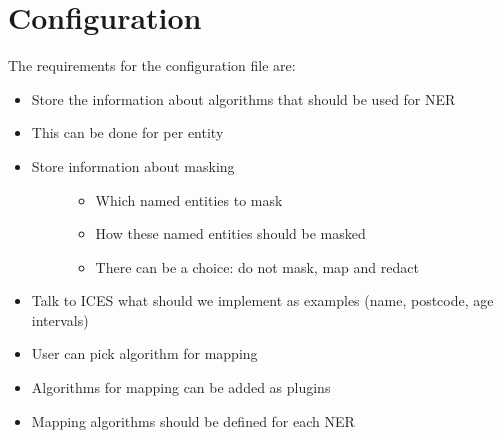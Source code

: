 \documentclass[letterpaper,10pt,english]{sphinxmanual}
\begin{document}
\section{Configuration}
\label{\detokenize{index:configuration}}
The requirements for the configuration file are:
\begin{itemize}
\item {} 
Store the information about algorithms that should be used for NER

\item {} 
This can be done for per entity

\item {} \begin{description}
\item[{Store information about masking}] \leavevmode\begin{itemize}
\item {} 
Which named entities to mask

\item {} 
How these named entities should be masked

\item {} 
There can be a choice: do not mask, map and redact

\end{itemize}

\end{description}

\item {} 
Talk to ICES what should we implement as examples (name, postcode, age intervals)

\item {} 
User can pick algorithm for mapping

\item {} 
Algorithms for mapping can be added as plugins

\item {} 
Mapping algorithms should be defined for each NER

\end{itemize}
\end{document}
